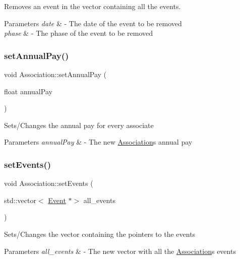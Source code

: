 Removes an event in the vector containing all the events. 


\begin{DoxyParams}{Parameters}
{\em date} & -\/ The date of the event to be removed \\
\hline
{\em phase} & -\/ The phase of the event to be removed \\
\hline
\end{DoxyParams}
\mbox{\label{classAssociation_a4279bd391a3110e4110d3f300b3423a3}} 
\subsubsection{\texorpdfstring{set\+Annual\+Pay()}{setAnnualPay()}}
{\footnotesize\ttfamily void Association\+::set\+Annual\+Pay (\begin{DoxyParamCaption}\item[{float}]{annual\+Pay }\end{DoxyParamCaption})}

Sets/\+Changes the annual pay for every associate


\begin{DoxyParams}{Parameters}
{\em annual\+Pay} & -\/ The new \mbox{\hyperlink{classAssociation}{Association}}\textquotesingle{}s annual pay \\
\hline
\end{DoxyParams}
\mbox{\label{classAssociation_a5611bc364e24e70f110332d1b2c63a08}} 
\subsubsection{\texorpdfstring{set\+Events()}{setEvents()}}
{\footnotesize\ttfamily void Association\+::set\+Events (\begin{DoxyParamCaption}\item[{std\+::vector$<$ \mbox{\hyperlink{classEvent}{Event}} $\ast$$>$}]{all\+\_\+events }\end{DoxyParamCaption})}

Sets/\+Changes the vector containing the pointers to the events


\begin{DoxyParams}{Parameters}
{\em all\+\_\+events} & -\/ The new vector with all the \mbox{\hyperlink{classAssociation}{Association}}\textquotesingle{}s events \\
\hline
\end{DoxyParams}
\mbox{\label{classAssociation_acbeba5c80457ba1c307c212bcad08b82}} 
